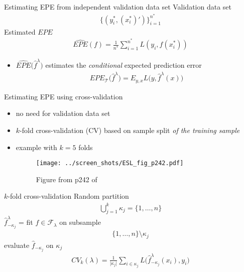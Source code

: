 \documentclass[xcolor=dvipsnames]{beamer}
\begin{document}
\begin{frame}{Estimating EPE from independent validation data set}
Validation data set 
\begin{align*}
  \{(y^*_i, (x_i^*)')\}_{i=1}^{n^*}
\end{align*}
Estimated $EPE$
\begin{align*}
  \widehat{EPE}\left(f\right) = \frac{1}{n^*} \sum_{i=1}^{n^*} L\left(y_i, f(x^*_i)\right)   
\end{align*}
\begin{itemize}
  \item $\widehat{EPE}\big(\hat{f}^{\lambda}\big)$ estimates the \emph{conditional} expected prediction error
  \begin{align*}
    EPE_{\mathcal{T}} \big(\hat{f}^{\lambda}\big) = E_{y, x} L \big(y, \hat{f}^{\lambda}(x) \big)
  \end{align*}
\end{itemize}
\end{frame}


\begin{frame}{Estimating EPE using cross-validation}
\begin{itemize}
  \item no need for validation data set
  \item $k$-fold cross-validation (CV) based on sample split \emph{of the training sample}
  \item example with $k=5$ folds
  \begin{figure}
  \texttt{[image: ../screen\_shots/ESL\_fig\_p242.pdf]}
   \caption{Figure from p242 of \textcite{hastie2009elements}}
\end{figure}
\end{itemize}
\end{frame}

\begin{frame}{$k$-fold cross-validation}
Random partition
\begin{align*}
\bigcup_{j = 1}^k \kappa_j = \{1, \dotsc, n\}
\end{align*}
$\hat{f}^{\lambda}_{-\kappa_j}$ = fit $f \in \mathcal{F}_{\lambda}$ on subsample 
\begin{align*}
  \{1, \dotsc, n\} \setminus \kappa_j
\end{align*}
evaluate $\hat{f}_{-\kappa_j}$ on $\kappa_j$
\begin{align*}
  CV_k(\lambda) = \frac{1}{\lvert\kappa_j\rvert} \sum_{i \in \kappa_j} L\big(\hat{f}^{\lambda}_{-\kappa_j}(x_i), y_i \big)
\end{align*}
\end{frame}
\end{document}
